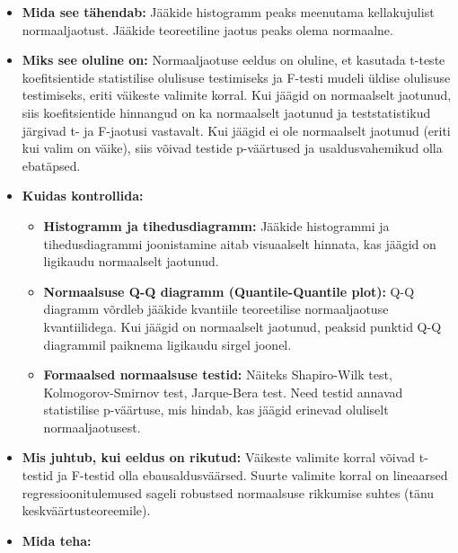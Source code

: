 \documentclass[
]{book}
\providecommand{\tightlist}{%
  \setlength{\itemsep}{0pt}\setlength{\parskip}{0pt}}
\begin{document}
\begin{itemize}
  \begin{itemize}
  \tightlist
  \item
    \textbf{Mida see tähendab:} Jääkide histogramm peaks meenutama kellakujulist normaaljaotust. Jääkide teoreetiline jaotus peaks olema normaalne.
  \item
    \textbf{Miks see oluline on:} Normaaljaotuse eeldus on oluline, et kasutada t-teste koefitsientide statistilise olulisuse testimiseks ja F-testi mudeli üldise olulisuse testimiseks, eriti väikeste valimite korral. Kui jäägid on normaalselt jaotunud, siis koefitsientide hinnangud on ka normaalselt jaotunud ja teststatistikud järgivad t- ja F-jaotusi vastavalt. Kui jäägid ei ole normaalselt jaotunud (eriti kui valim on väike), siis võivad testide p-väärtused ja usaldusvahemikud olla ebatäpsed.
  \item
    \textbf{Kuidas kontrollida:}

    \begin{itemize}
    \tightlist
    \item
      \textbf{Histogramm ja tihedusdiagramm:} Jääkide histogrammi ja tihedusdiagrammi joonistamine aitab visuaalselt hinnata, kas jäägid on ligikaudu normaalselt jaotunud.
    \item
      \textbf{Normaalsuse Q-Q diagramm (Quantile-Quantile plot):} Q-Q diagramm võrdleb jääkide kvantiile teoreetilise normaaljaotuse kvantiilidega. Kui jäägid on normaalselt jaotunud, peaksid punktid Q-Q diagrammil paiknema ligikaudu sirgel joonel.
    \item
      \textbf{Formaalsed normaalsuse testid:} Näiteks Shapiro-Wilk test, Kolmogorov-Smirnov test, Jarque-Bera test. Need testid annavad statistilise p-väärtuse, mis hindab, kas jäägid erinevad oluliselt normaaljaotusest.
    \end{itemize}
  \item
    \textbf{Mis juhtub, kui eeldus on rikutud:} Väikeste valimite korral võivad t-testid ja F-testid olla ebausaldusväärsed. Suurte valimite korral on lineaarsed regressioonitulemused sageli robustsed normaalsuse rikkumise suhtes (tänu keskväärtusteoreemile).
  \item
    \textbf{Mida teha:}


\end{itemize}
\end{itemize}
\end{document}
